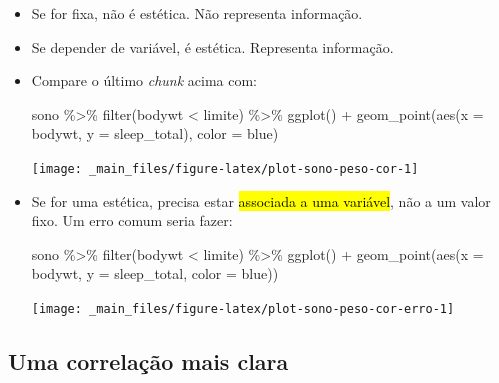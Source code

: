 \documentclass[
  11pt]{report}
\newenvironment{Shaded}{\begin{snugshade}}{\end{snugshade}}
\newcommand{\AttributeTok}[1]{\textcolor[rgb]{0.77,0.63,0.00}{#1}}
\newcommand{\FunctionTok}[1]{\textcolor[rgb]{0.00,0.00,0.00}{#1}}
\newcommand{\NormalTok}[1]{#1}
\newcommand{\SpecialCharTok}[1]{\textcolor[rgb]{0.00,0.00,0.00}{#1}}
\newcommand{\StringTok}[1]{\textcolor[rgb]{0.31,0.60,0.02}{#1}}
\begin{document}
\begin{itemize}
\item
  Se for fixa, não é estética. Não representa informação.
\item
  Se depender de variável, é estética. Representa informação.
\item
  Compare o último \emph{chunk} acima com:

\begin{Shaded}
\begin{Highlighting}[]
\NormalTok{sono }\SpecialCharTok{\%\textgreater{}\%} 
  \FunctionTok{filter}\NormalTok{(bodywt }\SpecialCharTok{\textless{}}\NormalTok{ limite) }\SpecialCharTok{\%\textgreater{}\%} 
  \FunctionTok{ggplot}\NormalTok{() }\SpecialCharTok{+}
    \FunctionTok{geom\_point}\NormalTok{(}\FunctionTok{aes}\NormalTok{(}\AttributeTok{x =}\NormalTok{ bodywt, }\AttributeTok{y =}\NormalTok{ sleep\_total), }\AttributeTok{color =} \StringTok{\textquotesingle{}blue\textquotesingle{}}\NormalTok{)}
\end{Highlighting}
\end{Shaded}

  \begin{center}\texttt{[image: \_main\_files/figure-latex/plot-sono-peso-cor-1]} \end{center}
\item
  Se for uma estética, precisa estar {\hl{associada a uma variável}}, não a um valor fixo. Um erro comum seria fazer:

\begin{Shaded}
\begin{Highlighting}[]
\NormalTok{sono }\SpecialCharTok{\%\textgreater{}\%} 
  \FunctionTok{filter}\NormalTok{(bodywt }\SpecialCharTok{\textless{}}\NormalTok{ limite) }\SpecialCharTok{\%\textgreater{}\%} 
  \FunctionTok{ggplot}\NormalTok{() }\SpecialCharTok{+}
    \FunctionTok{geom\_point}\NormalTok{(}\FunctionTok{aes}\NormalTok{(}\AttributeTok{x =}\NormalTok{ bodywt, }\AttributeTok{y =}\NormalTok{ sleep\_total, }\AttributeTok{color =} \StringTok{\textquotesingle{}blue\textquotesingle{}}\NormalTok{))}
\end{Highlighting}
\end{Shaded}

  \begin{center}\texttt{[image: \_main\_files/figure-latex/plot-sono-peso-cor-erro-1]} \end{center}
\end{itemize}

\hypertarget{uma-correlauxe7uxe3o-mais-clara}{%
\subsection{Uma correlação mais clara}\label{uma-correlauxe7uxe3o-mais-clara}}
\end{document}
